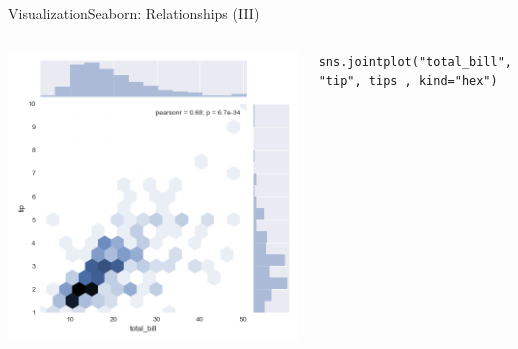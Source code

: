 \documentclass[10pt,compress]{beamer} %
\begin{document}
\begin{frame}[fragile]{Visualization}{Seaborn: Relationships (III)}
\begin{columns}
	\includegraphics[width=\textwidth]{figs/sns-jointplothex.png}\\
	\begin{exampleblock}{}
	\vspace{-0.2cm} 
	\begin{lstlisting}[basicstyle=\tiny]
	sns.jointplot("total_bill", "tip", tips , kind="hex")
	\end{lstlisting}
	\vspace{-0.2cm} 
	\end{exampleblock}

	\end{columns}
\end{frame}
\end{document}
